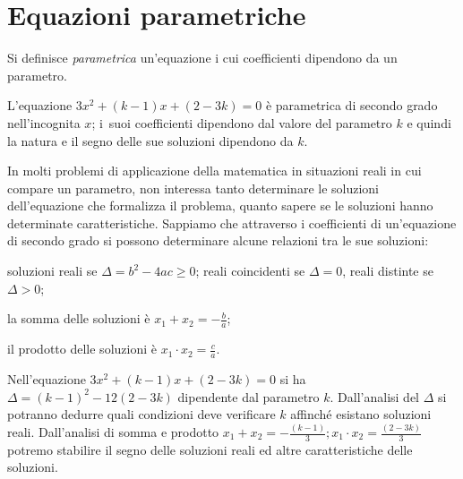 \section{Equazioni parametriche}

\begin{definizione}
Si definisce \emph{parametrica} un’equazione i cui coefficienti dipendono da un parametro.
\end{definizione}
L’equazione $3 x^{2} + ( k - 1 ) x + ( 2 - 3 k ) = 0$ è parametrica di secondo grado nell’incognita $x$; i~suoi coefficienti dipendono dal valore del parametro $k$ e quindi la natura e il segno delle sue soluzioni dipendono da $k$.

In molti problemi di applicazione della matematica in situazioni reali in cui compare un parametro, non interessa tanto determinare le soluzioni dell’equazione che formalizza il problema, quanto sapere se le soluzioni hanno determinate caratteristiche.
Sappiamo che attraverso i coefficienti di un’equazione di secondo grado si possono determinare alcune relazioni tra le sue soluzioni:
\begin{itemize*}
\item soluzioni reali se $\Delta = b^{2} - 4 a c \geq 0$; reali coincidenti se $\Delta = 0$, reali distinte se $\Delta > 0$;
\item la somma delle soluzioni è $x_{1} + x_{2} = - \frac{b}{a}$;
\item il prodotto delle soluzioni è $x_{1} \cdot x_{2} = \frac{c}{a}$.
\end{itemize*}

Nell’equazione $3 x^{2} + ( k - 1 ) x + ( 2 - 3 k ) = 0$ si ha $\Delta = ( k - 1 )^{2} - 12 ( 2 - 3 k )$ dipendente dal parametro $k$.
Dall'analisi del $\Delta$ si potranno dedurre quali condizioni deve verificare $k$ affinché esistano soluzioni reali. Dall'analisi di somma e prodotto
$x_{1} + x_{2} = - \frac{( k - 1 )}{3}; x_{1} \cdot x_{2} =\frac{( 2 - 3 k )}{3}$ potremo stabilire il segno delle soluzioni reali ed altre caratteristiche delle soluzioni.

